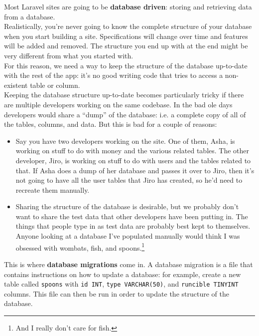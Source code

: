 Most Laravel sites are going to be \textbf{database driven}: storing and retrieving data from a database.
\\

Realistically, you're never going to know the complete structure of your database when you start building a site. Specifications will change over time and features will be added and removed. The structure you end up with at the end might be very different from what you started with.
\\

For this reason, we need a way to keep the structure of the database up-to-date with the rest of the app: it's no good writing code that tries to access a non-existent table or column.
\\

Keeping the database structure up-to-date becomes particularly tricky if there are multiple developers working on the same codebase. In the bad ole days developers would share a ``dump'' of the database: i.e. a complete copy of all of the tables, columns, and data. But this is bad for a couple of reasons:

\begin{itemize}
    \item Say you have two developers working on the site. One of them, Asha, is working on stuff to do with money and the various related tables. The other developer, Jiro, is working on stuff to do with users and the tables related to that. If Asha does a dump of her database and passes it over to Jiro, then it's not going to have all the user tables that Jiro has created, so he'd need to recreate them manually.

    \item Sharing the structure of the database is desirable, but we probably don't want to share the test data that other developers have been putting in. The things that people type in as test data are probably best kept to themselves. Anyone looking at a database I've populated manually would think I was obsessed with wombats, fish, and spoons.\footnote{And I really don't care for fish.}
\end{itemize}

This is where \textbf{database migrations} come in. A database migration is a file that contains instructions on how to update a database: for example, create a new table called \texttt{spoons} with \texttt{id INT}, \texttt{type VARCHAR(50)}, and \texttt{runcible TINYINT} columns. This file can then be run in order to update the structure of the database.
\\

